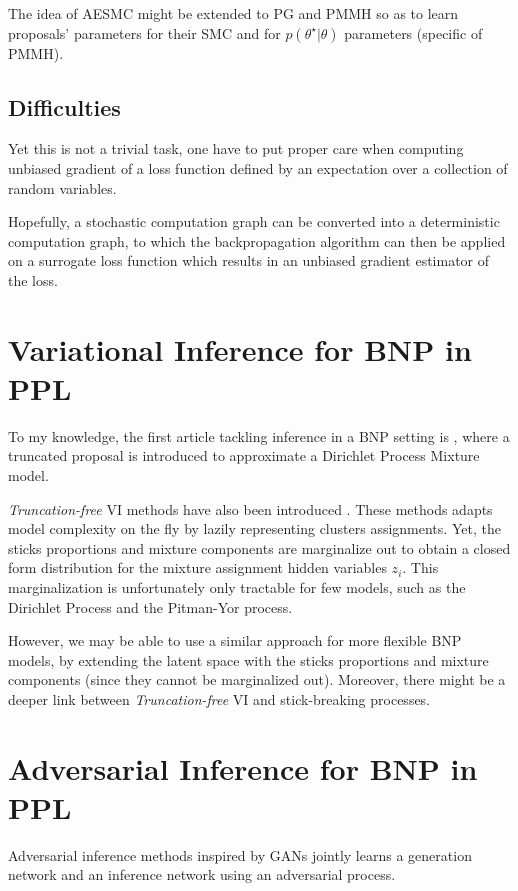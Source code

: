 The idea of AESMC \cite{Le:2017wm} might be extended to \gls{PG} and \gls{PMMH} so as to learn proposals' parameters for their \gls{SMC} and for $p(\theta^\star|\theta)$ parameters (specific of \gls{PMMH}).

\subsection{Difficulties}
Yet this is not a trivial task, one have to put proper care when computing unbiased gradient of a loss function defined by an expectation over a collection of random variables.

Hopefully, a stochastic computation graph \cite{Schulman:2015wk} can be converted into a deterministic computation graph, to which the backpropagation algorithm can then be applied on a surrogate loss function which results in an unbiased gradient estimator of the loss.



\section{Variational Inference for \gls{BNP} in \gls{PPL}}
To my knowledge, the first article tackling inference in a \gls{BNP} setting is \cite{Blei:2006fo}, where
a truncated proposal is introduced to approximate a Dirichlet Process Mixture model.

\textit{Truncation-free} \gls{VI} methods have also been introduced \cite{Blei:2012uu}. These methods adapts model complexity on the fly by lazily representing clusters assignments. Yet, the sticks proportions and mixture components are marginalize out to obtain a closed form distribution for the mixture assignment hidden variables $z_i$. This marginalization is unfortunately only tractable for few models, such as the Dirichlet Process and the Pitman-Yor process.

However, we may be able to use a similar approach for more flexible \gls{BNP} models, by extending the latent space with the sticks proportions and mixture components (since they cannot be marginalized out).
Moreover, there might be a deeper link between \textit{Truncation-free} \gls{VI} and stick-breaking processes.



\section{Adversarial Inference for \gls{BNP} in \gls{PPL}}
Adversarial inference methods \cite{Dumoulin:2016td, Donahue:2016wo, DBLP:conf/icml/MeschederNG17} inspired by GANs \cite{Goodfellow:2014wp} jointly learns a generation network and an inference network using an adversarial process.

